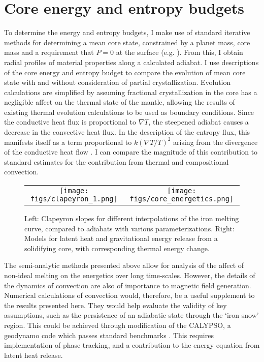 \section{Core energy and entropy budgets} \label{budget}

To determine the energy and entropy budgets, I make use of standard iterative
methods for determining a mean core state, constrained by a planet mass, core
mass and a requirement that $P=0$ at the surface (e.g. \citet{Lister1995}). From
this, I obtain radial profiles of material properties along a calculated
adiabat.  I use descriptions of the core energy and entropy budget
\citep{Gubbins1979,Lister1995,Lister2003} to compare the evolution of mean core state
with and without consideration of partial crystallization. Evolution
calculations are simplified by assuming fractional crystallization in the
core has a negligible affect on the thermal state of the mantle, allowing the
results of existing thermal evolution calculations \citep{Hauck2004,Breuer2007} to
be used as boundary conditions. Since the conductive heat flux is proportional
to $\nabla T$, the steepened adiabat causes a decrease in the convective
heat flux. In the description of the entropy flux, this manifests itself as a
term proportional to $k\left(\nabla T / T \right)^2$ arising from the
divergence of the conductive heat flow \citep{Lister2003}. I can compare the
magnitude of this contribution to standard estimates for the contribution from
thermal and compositional convection.


 \begin{figure}[h] %
   \centering
\begin{tabular}{cc}
 \texttt{[image: figs/clapeyron\_1.png]} &
 \texttt{[image: figs/core\_energetics.png]} \\
\end{tabular}
\caption{Left: Clapeyron slopes for different interpolations of the iron
melting curve, compared to adiabats with various parameterizations.  Right:  Models
for latent heat and gravitational energy release from a solidifying core, with
corresponding thermal energy change.}
\label{fig:core_energy}
\end{figure}

The semi-analytic methods presented above allow for analysis of the
affect of non-ideal melting on the energetics over long time-scales. However,
the details of the dynamics of convection are also of importance to magnetic field
generation. Numerical calculations of convection would, therefore, be a useful
supplement to the results presented here. They would help evaluate the validity of
key assumptions, such as the persistence of an adiabatic state through the
`iron snow' region. This could be achieved through modification of the CALYPSO,
a geodynamo code which passes standard benchmarks \citep{Christensen2001}. This
requires implementation of phase tracking, and a contribution to the energy
equation from latent heat release. 


